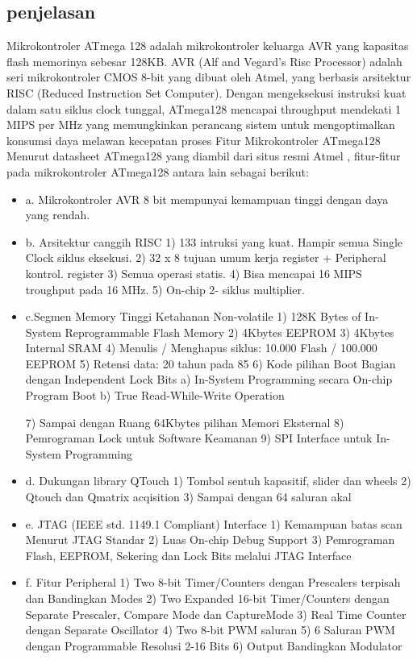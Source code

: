 	\subsection{penjelasan}
	Mikrokontroler ATmega 128 adalah mikrokontroler keluarga AVR yang kapasitas flash memorinya sebesar 128KB. AVR (Alf and Vegard’s Risc Processor) adalah seri mikrokontroler CMOS 8-bit yang dibuat oleh Atmel, yang berbasis arsitektur RISC (Reduced Instruction Set Computer). Dengan mengeksekusi instruksi kuat dalam satu siklus clock tunggal, ATmega128 mencapai throughput mendekati 1 MIPS per MHz yang memungkinkan perancang sistem untuk mengoptimalkan konsumsi daya melawan kecepatan proses
	Fitur Mikrokontroler ATmega128
	Menurut datasheet ATmega128 yang diambil dari situs resmi Atmel , fitur-fitur pada mikrokontroler ATmega128 antara lain sebagai berikut:
	\begin{itemize}
		\item a. Mikrokontroler AVR 8 bit mempunyai kemampuan tinggi dengan daya yang rendah. 
		\item b. Arsitektur canggih RISC
				1) 133 intruksi yang kuat. Hampir semua Single Clock siklus eksekusi.
				2) 32 x 8 tujuan umum kerja register + Peripheral kontrol. register 
				3) Semua operasi statis.
				4) Bisa mencapai 16 MIPS troughput pada 16 MHz.
				5) On-chip 2- siklus multiplier.
		\item c.Segmen Memory Tinggi Ketahanan Non-volatile 
				1) 128K Bytes of In-System Reprogrammable Flash Memory
				2) 4Kbytes EEPROM
				3) 4Kbytes Internal SRAM
				4) Menulis / Menghapus siklus: 10.000 Flash / 100.000 EEPROM 
				5) Retensi data: 20 tahun pada 85 
				6) Kode pilihan Boot Bagian dengan Independent Lock Bits 
					a) In-System Programming secara On-chip Program Boot 
					b) True Read-While-Write Operation 
					
				7) Sampai dengan Ruang 64Kbytes pilihan Memori Eksternal
				8) Pemrograman Lock untuk Software Keamanan
				9) SPI Interface untuk In-System Programming
		\item d. Dukungan library QTouch
				1) Tombol sentuh kapasitif, slider dan wheels 
				2) Qtouch dan Qmatrix acqisition 
				3) Sampai dengan 64 saluran akal 
		\item e. JTAG (IEEE std. 1149.1 Compliant) Interface
				1) Kemampuan batas scan Menurut JTAG Standar
				2) Luas On-chip Debug Support 3) Pemrograman Flash, EEPROM, Sekering dan Lock Bits melalui  JTAG Interface
		\item f. Fitur Peripheral 
				1) Two 8-bit Timer/Counters dengan Prescalers terpisah dan Bandingkan Modes 
				2) Two Expanded 16-bit Timer/Counters dengan Separate Prescaler, Compare Mode dan CaptureMode 
				3) Real Time Counter dengan Separate Oscillator
				4) Two 8-bit PWM saluran 
				5) 6 Saluran PWM dengan Programmable Resolusi 2-16 Bits 
				6) Output Bandingkan Modulator

		\end{itemize}

	